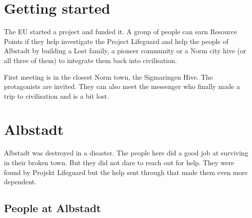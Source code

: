 \section{Getting started}

The EU started a project and funded it. A group of people can earn Resource Points if they help investigate the Project Lifeguard and help the people of Albstadt by building a Lost family, a pioneer community or a Norm city hive (or all three of them) to integrate them back into civilisation.

First meeting is in the closest Norm town, the Sigmaringen Hive. The protagonists are invited. They can also meet the messenger who finally made a trip to civilisation and is a bit lost.


\section{Albstadt}

Albstadt was destroyed in a disaster.
The people here did a good job at surviving in their broken town. But they did not dare to reach out for help. They were found by Projekt Lifeguard but the help sent through that made them even more dependent.


\subsection{People at Albstadt}

